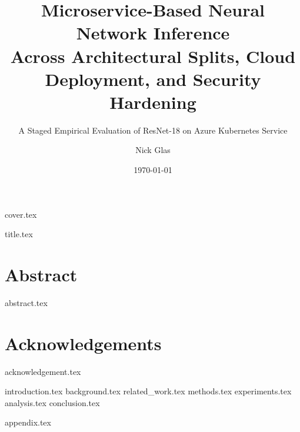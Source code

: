 \documentclass{mscthesis}
\title{Microservice-Based Neural Network Inference\\Across Architectural Splits, Cloud Deployment, and Security Hardening}
\subtitle{A Staged Empirical Evaluation of ResNet-18 on Azure Kubernetes Service}
\date{\today}
\author{Nick Glas}
\begin{document}
%
%

\frontmatter
{cover.tex}

\cleartorecto{}
{title.tex}


\openany
\chapter{Abstract}
{abstract.tex}
\openright
\glsresetall{}

\cleartorecto{}
\tableofcontents{}
\clearpage{}

\listoffigures{}
\clearpage{}

\listoftables{}
\clearpage{}

\cleartorecto{}
\chapter{Acknowledgements}
{acknowledgement.tex}


\mainmatter

{introduction.tex}
{background.tex}
{related_work.tex}
{methods.tex}
{experiments.tex}
{analysis.tex}
{conclusion.tex}

%
%

\appendix

{appendix.tex}

%
%

\backmatter

\printbibliography[heading=bibintoc,title={References}]
\cleardoublepage{}

\printacronyms[style=long,title={Acronyms}]
\cleardoublepage{}

\end{document}
